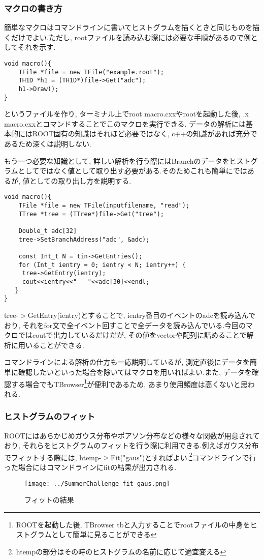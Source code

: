 \subsubsection{マクロの書き方}
簡単なマクロはコマンドラインに書いてヒストグラムを描くときと同じものを描くだけでよい.ただし, rootファイルを読み込む際には必要な手順があるので例としてそれを示す.
\begin{lstlisting}[basicstyle=\ttfamily\footnotesize, frame=single]
void macro(){
	TFile *file = new TFile("example.root");
	TH1D *h1 = (TH1D*)file->Get("adc");
	h1->Draw();
}
 \end{lstlisting}
というファイルを作り, ターミナル上でroot macro.cxxやrootを起動した後, .x macro.cxxとコマンドすることでこのマクロを実行できる.
データの解析には基本的にはROOT固有の知識はそれほど必要ではなく, c++の知識があれば充分であるため深くは説明しない.

もう一つ必要な知識として, 詳しい解析を行う際にはBranchのデータをヒストグラムとしてではなく値として取り出す必要がある.そのためこれも簡単にではあるが, 値としての取り出し方を説明する.

\begin{lstlisting}
void macro(){
    TFile *file = new TFile(inputfilename, "read");
    TTree *tree = (TTree*)file->Get("tree");

    Double_t adc[32]
    tree->SetBranchAddress("adc", &adc);

    const Int_t N = tin->GetEntries();
    for (Int_t ientry = 0; ientry < N; ientry++) {
     tree->GetEntry(ientry);
     cout<<ientry<<"   "<<adc[30]<<endl;
   }
}
 \end{lstlisting}

tree-$>$GetEntry(ientry)とすることで, ientry番目のイベントのadcを読み込んでおり, それをfor文で全イベント回すことで全データを読み込んでいる.今回のマクロではcoutで出力しているだけだが, その値をvectorや配列に詰めることで解析に用いることができる.

コマンドラインによる解析の仕方も一応説明しているが, 測定直後にデータを簡単に確認したいといった場合を除いてはマクロを用いればよい.また, データを確認する場合でもTBrowser\footnote{ROOTを起動した後, TBrowser tbと入力することでrootファイルの中身をヒストグラムとして簡単に見ることができる}が便利であるため, あまり使用頻度は高くないと思われる.

\subsubsection{ヒストグラムのフィット}
ROOTにはあらかじめガウス分布やポアソン分布などの様々な関数が用意されており, それらをヒストグラムのフィットを行う際に利用できる.例えばガウス分布でフィットする際には, htemp-$>$Fit("gaus")とすればよい.\footnote{htempの部分はその時のヒストグラムの名前に応じて適宜変える}コマンドラインで行った場合にはコマンドラインにfitの結果が出力される.
\begin{figure}[h]
  \begin{center}
    \texttt{[image: ../SummerChallenge\_fit\_gaus.png]}
    \caption{フィットの結果}
    \label{fig:fit_gaus}
  \end{center}
\end{figure}

